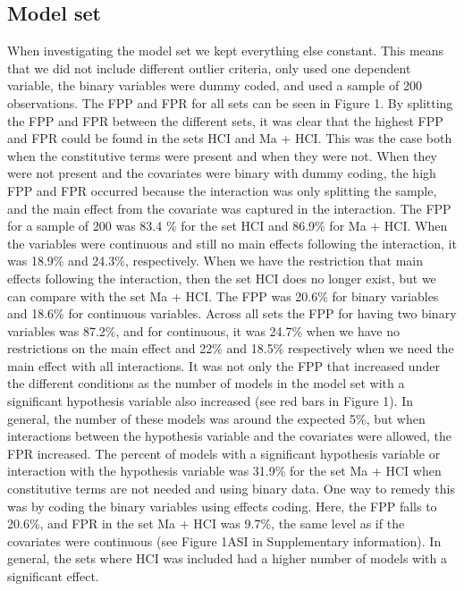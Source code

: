 \subsection{Model set}
When investigating the model set we kept everything else constant. This means that we did not include different outlier criteria, only used one dependent variable, the binary variables were dummy coded, and used a sample of 200 observations. The FPP and FPR for all sets can be seen in Figure 1.
By splitting the FPP and FPR between the different sets, it was clear that the highest FPP and FPR could be found in the sets HCI and Ma + HCI. This was the case both when the constitutive terms were present and when they were not. When they were not present and the covariates were binary with dummy coding, the high FPP and FPR occurred because the interaction was only splitting the sample, and the main effect from the covariate was captured in the interaction. The FPP for a sample of 200 was 83.4 \% for the set HCI and 86.9\% for Ma + HCI. When the variables were continuous and still no main effects following the interaction, it was 18.9\% and 24.3\%, respectively. When we have the restriction that main effects following the interaction, then the set HCI does no longer exist, but we can compare with the set Ma + HCI. The FPP was 20.6\% for binary variables and 18.6\% for continuous variables. Across all sets the FPP for having two binary variables was 87.2\%, and for continuous, it was 24.7\% when we have no restrictions on the main effect and 22\% and 18.5\% respectively when we need the main effect with all interactions. 
It was not only the FPP that increased under the different conditions as the number of models in the model set with a significant hypothesis variable also increased (see red bars in Figure 1). In general, the number of these models was around the expected 5\%, but when interactions between the hypothesis variable and the covariates were allowed, the FPR increased. The percent of models with a significant hypothesis variable or interaction with the hypothesis variable was 31.9\% for the set Ma + HCI when constitutive terms are not needed and using binary data. One way to remedy this was by coding the binary variables using effects coding. Here, the FPP falls to 20.6\%, and FPR in the set Ma + HCI was 9.7\%, the same level as if the covariates were continuous (see Figure 1ASI in Supplementary information). In general, the sets where HCI was included had a higher number of models with a significant effect. 
